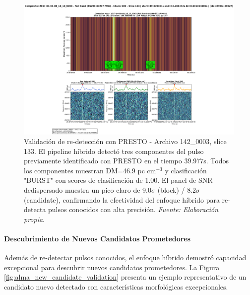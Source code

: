 \begin{figure}[H]
    \centering
    \includegraphics[width=\textwidth]{figures/DRAFTS-HF-SNR/2017-04-03-08_16_13_0003_slice133.png}
    \caption[Re-detección PRESTO: Archivo 142\_0003, Tiempo 39.977s]{Validación de re-detección con PRESTO - Archivo 142\_0003, slice 133. El pipeline híbrido detectó tres componentes del pulso previamente identificado con PRESTO en el tiempo 39.977s. Todos los componentes muestran DM=46.9 pc cm$^{-3}$ y clasificación "BURST" con scores de clasificación de 1.00. El panel de SNR dedispersado muestra un pico claro de 9.0$\sigma$ (block) / 8.2$\sigma$ (candidate), confirmando la efectividad del enfoque híbrido para re-detecta pulsos conocidos con alta precisión. \textit{Fuente: Elaboración propia}.}
    \label{fig:alma_presence_validation_2}
\end{figure}

\paragraph{Descubrimiento de Nuevos Candidatos Prometedores}

Además de re-detectar pulsos conocidos, el enfoque híbrido demostró capacidad excepcional para descubrir nuevos candidatos prometedores. La Figura \ref{fig:alma_new_candidate_validation} presenta un ejemplo representativo de un candidato nuevo detectado con características morfológicas excepcionales.

